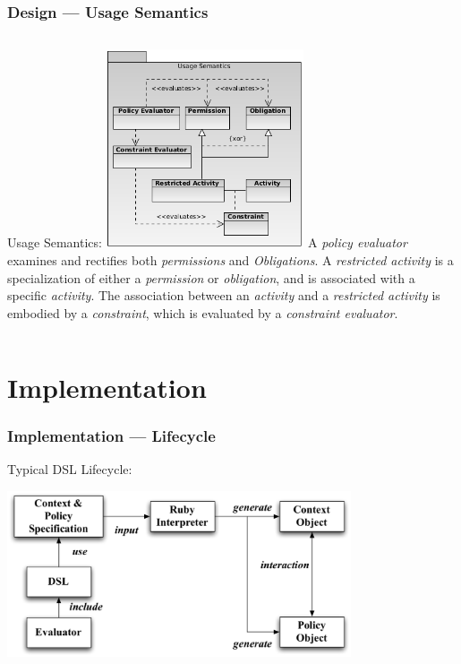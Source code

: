 \documentclass[t, xcolor=dvipsnames, handout, 10pt]{beamer}
\begin{document}
\begin{frame}[t]
\frametitle{Design --- Usage Semantics}
\begin{columns}[t]
Usage Semantics:
\includegraphics[width=2.3in]{usage-semantics}
\pause
A \textit{policy evaluator} examines and rectifies both \textit{permissions} and \textit{Obligations}.
\newline
\newline
\pause
A \textit{restricted activity} is a specialization of either a \textit{permission} or \textit{obligation}, and is associated with a specific \textit{activity}.
\newline
\newline
\pause
The association between an \textit{activity} and a \textit{restricted activity} is embodied by a \textit{constraint}, which is evaluated by a \textit{constraint evaluator}.
\end{columns}
\end{frame}

\section{Implementation}
\begin{frame}[t]
\frametitle{Implementation --- Lifecycle}
Typical DSL Lifecycle: \\
\begin{center}
\includegraphics[width=4in]{DSL-usage}
\end{center}
\end{frame}
\end{document}
